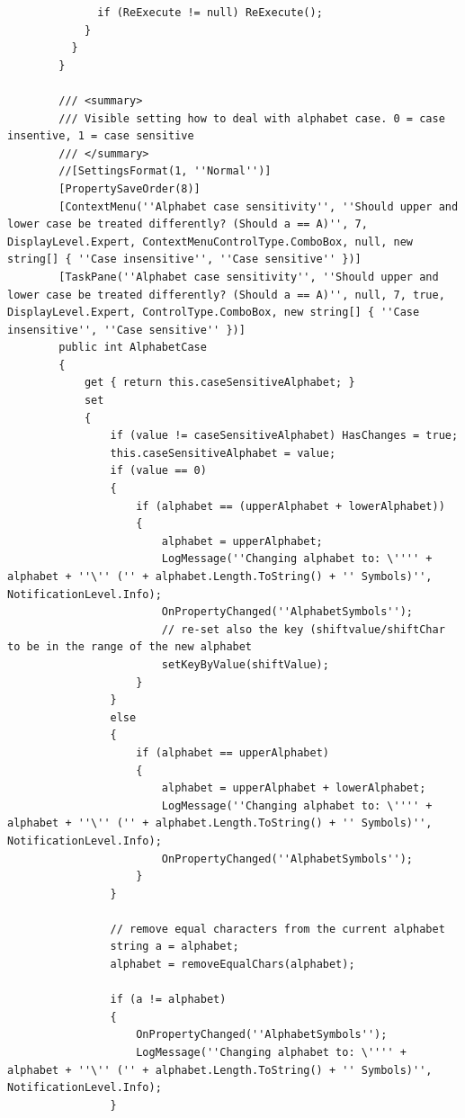 \begin{lstlisting}
              if (ReExecute != null) ReExecute();
            }
          }
        }

        /// <summary>
        /// Visible setting how to deal with alphabet case. 0 = case insentive, 1 = case sensitive
        /// </summary>
        //[SettingsFormat(1, ''Normal'')]
        [PropertySaveOrder(8)]
        [ContextMenu(''Alphabet case sensitivity'', ''Should upper and lower case be treated differently? (Should a == A)'', 7, DisplayLevel.Expert, ContextMenuControlType.ComboBox, null, new string[] { ''Case insensitive'', ''Case sensitive'' })]
        [TaskPane(''Alphabet case sensitivity'', ''Should upper and lower case be treated differently? (Should a == A)'', null, 7, true, DisplayLevel.Expert, ControlType.ComboBox, new string[] { ''Case insensitive'', ''Case sensitive'' })]
        public int AlphabetCase
        {
            get { return this.caseSensitiveAlphabet; }
            set
            {
                if (value != caseSensitiveAlphabet) HasChanges = true;
                this.caseSensitiveAlphabet = value;
                if (value == 0)
                {
                    if (alphabet == (upperAlphabet + lowerAlphabet))
                    {
                        alphabet = upperAlphabet;
                        LogMessage(''Changing alphabet to: \'''' + alphabet + ''\'' ('' + alphabet.Length.ToString() + '' Symbols)'', NotificationLevel.Info);
                        OnPropertyChanged(''AlphabetSymbols'');
                        // re-set also the key (shiftvalue/shiftChar to be in the range of the new alphabet
                        setKeyByValue(shiftValue);
                    }
                }
                else
                {
                    if (alphabet == upperAlphabet)
                    {
                        alphabet = upperAlphabet + lowerAlphabet;
                        LogMessage(''Changing alphabet to: \'''' + alphabet + ''\'' ('' + alphabet.Length.ToString() + '' Symbols)'', NotificationLevel.Info);
                        OnPropertyChanged(''AlphabetSymbols'');
                    }
                }

                // remove equal characters from the current alphabet
                string a = alphabet;
                alphabet = removeEqualChars(alphabet);

                if (a != alphabet)
                {
                    OnPropertyChanged(''AlphabetSymbols'');
                    LogMessage(''Changing alphabet to: \'''' + alphabet + ''\'' ('' + alphabet.Length.ToString() + '' Symbols)'', NotificationLevel.Info);
                }


\end{lstlisting}
